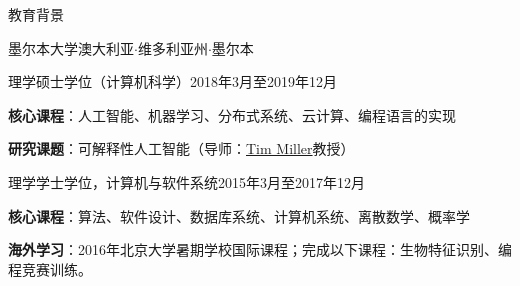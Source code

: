 \documentclass{xsha}
\begin{document}
\address{
\textbf{电话号码} +86 136******** $\cdot$\space
\textbf{电子邮箱} \href{mailto:luo@jiahai.co}{luo@jiahai.co} $\cdot$\space
\textbf{领英} \href{https://linkedin.com/in/luojiahai/}{in/luojiahai} $\cdot$\space
\textbf{GitHub} \href{https://github.com/luojiahai/}{luojiahai} $\cdot$\space
\textbf{个人网站} \href{https://luojiahai.com/}{luojiahai.com}
}

\begin{xsection}{教育背景}

\begin{xheading}{墨尔本大学}{澳大利亚$\cdot$维多利亚州$\cdot$墨尔本}
\begin{xsubheading}{理学硕士学位（计算机科学）}{2018年3月至2019年12月}
\item \textbf{核心课程}：人工智能、机器学习、分布式系统、云计算、编程语言的实现
\item \textbf{研究课题}：可解释性人工智能（导师：\href{https://eecs.uq.edu.au/profile/9477/tim-miller}{Tim Miller}教授）
\end{xsubheading}
\begin{xsubheading}{理学学士学位，计算机与软件系统}{2015年3月至2017年12月}
\item \textbf{核心课程}：算法、软件设计、数据库系统、计算机系统、离散数学、概率学
\item \textbf{海外学习}：2016年北京大学暑期学校国际课程；完成以下课程：生物特征识别、编程竞赛训练。
\end{xsubheading}
\end{xheading}

\end{xsection}
\end{document}
